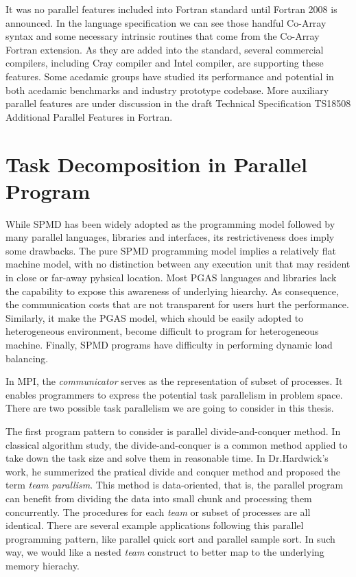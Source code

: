 It was no parallel features included into Fortran standard until Fortran 2008 is announced. In the language specification we can see those handful Co-Array syntax and some necessary intrinsic routines that come from the Co-Array Fortran extension. As they are added into the standard, several commercial compilers, including Cray compiler and Intel compiler, are supporting these features. Some acedamic groups have studied its performance and potential\cite{barrett2006co}\cite{coarfa2003co} in both acedamic benchmarks and industry prototype codebase. More auxiliary parallel features are under discussion in the draft Technical Specification TS18508 Additional Parallel Features in Fortran\cite{caf-spec}.

\section{Task Decomposition in Parallel Program}

While SPMD has been widely adopted as the programming model followed by many parallel languages, libraries and interfaces, its restrictiveness does imply some drawbacks. The pure SPMD programming model implies a relatively flat machine model, with no distinction between any execution unit that may resident in close or far-away pyhsical location. Most PGAS languages and libraries lack the capability to expose this awareness of underlying hiearchy. As consequence, the communication costs that are not transparent for users hurt the performance. Similarly, it make the PGAS model, which should be easily adopted to heterogeneous environment, become difficult to program for heterogeneous machine. Finally, SPMD programs have difficulty in performing dynamic load balancing. 

In MPI\cite{gropp1999using}, the \textit{communicator} serves as the representation of subset of processes. It enables programmers to express the potential task parallelism in problem space. There are two possible task parallelism we are going to consider in this thesis. 

The first program pattern to consider is parallel divide-and-conquer method. In classical algorithm study, the divide-and-conquer is a common method applied to take down the task size and solve them in reasonable time. In Dr.Hardwick's work\cite{hardwick1997practical}, he summerized the pratical divide and conquer method and proposed the term \textit{team parallism}. This method is data-oriented, that is, the parallel program can benefit from dividing the data into small chunk and processing them concurrently. The procedures for each \textit{team} or subset of processes are all identical. There are several example applications following this parallel programming pattern, like parallel quick sort and parallel sample sort\cite{hirschberg1978fast}. In such way, we would like a nested \textit{team} construct to better map to the underlying memory hierachy.

